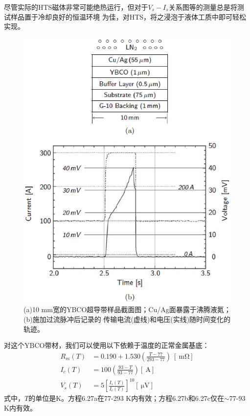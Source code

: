 尽管实际的HTS磁体非常可能绝热运行，但对于$V_s-I_s$关系图等的测量总是将测试样品置于冷却良好的恒温环境
为佳，对HTS，将之浸泡于液体工质中即可轻松实现。
\begin{figure}[htbp]
	\centering
	\includegraphics[scale=0.6]{chpt6/figs/fig6.12.eps}
	\caption{(a)10 mm宽的YBCO超导带样品截面图；Cu/Ag面暴露于沸腾液氮；(b)施加过流脉冲后记录的
		传输电流(虚线)和电压(实线)随时间变化的轨迹。}
\end{figure}
对这个YBCO带材，我们可以使用以下依赖于温度的正常金属基底：
\begin{subequations}
	\begin{align}
	R_m(T)&=0.190+1.530(\frac{T-77}{293-77})\ [\ \mathrm{m\Omega}]\\
	I_c(T)&=100(\frac{93-T}{93-77})[\ \mathrm{A}]\\
	V_s(T)&=5[\frac{I_s(T)}{I_c(T)}]^{10} [\ \mathrm{\mu V}]
	\end{align}
\end{subequations}
式中，$T$的单位是K。方程6.27a在77-293 K内有效；方程6.27b和6.27c仅在$\sim $77-93 K内有效。

